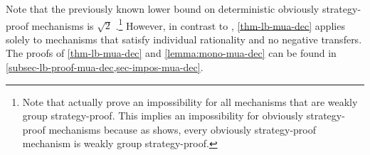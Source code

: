 Note that the previously known lower bound on deterministic obviously strategy-proof mechanisms is $\sqrt 2$ \cite{GMR17}.\footnote{Note that \cite{GMR17} actually prove an impossibility for all mechanisms that are weakly group strategy-proof. This implies an impossibility for obviously strategy-proof mechanisms because as \cite{li} shows, every obviously strategy-proof mechanism is weakly group strategy-proof.} However, in contrast to \cite{GMR17}, \cref{thm-lb-mua-dec} applies solely to mechanisms that satisfy individual rationality and no negative transfers.   
The proofs  of \cref{thm-lb-mua-dec} and \cref{lemma:mono-mua-dec} can be found in \cref{subsec-lb-proof-mua-dec,sec-impos-mua-dec}.  

